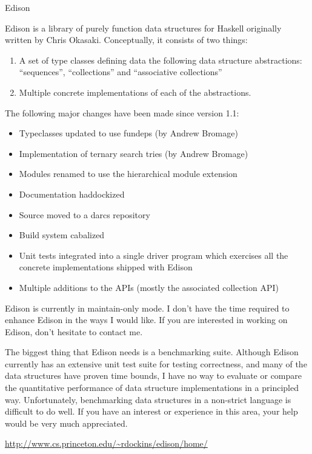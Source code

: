 \documentclass{article}
\begin{document}
\begin{hcarentry}{Edison}
\makeheader

Edison is a library of purely function data structures for Haskell
originally written by Chris Okasaki.  Conceptually, it consists of two
things:
\begin{enumerate}
\item A set of type classes defining data the following data structure
      abstractions: ``sequences'', ``collections'' and ``associative collections''
\item Multiple concrete implementations of each of the abstractions.
\end{enumerate}

The following major changes have been made since version 1.1:

\begin{itemize}
\item Typeclasses updated to use fundeps (by Andrew Bromage)
\item Implementation of ternary search tries (by Andrew Bromage)
\item Modules renamed to use the hierarchical module extension
\item Documentation haddockized
\item Source moved to a darcs repository
\item Build system cabalized
\item Unit tests integrated into a single driver program which exercises
      all the concrete implementations shipped with Edison
\item Multiple additions to the APIs (mostly the associated collection API)
\end{itemize}

Edison is currently in maintain-only mode. I don't have the time required
to enhance Edison in the ways I would like.  If you are interested in
working on Edison, don't hesitate to contact me.

The biggest thing that Edison needs is a benchmarking suite.  Although
Edison currently has an extensive unit test suite for testing correctness,
and many of the data structures have proven time bounds,
I have no way to evaluate or compare the quantitative
performance of data structure implementations in a
principled way.  Unfortunately, benchmarking data structures
in a non-strict language is difficult to do well.
If you have an interest or experience in this area, your help
would be very much appreciated.

\FurtherReading
\url{http://www.cs.princeton.edu/~rdockins/edison/home/}
\end{hcarentry}
\end{document}
